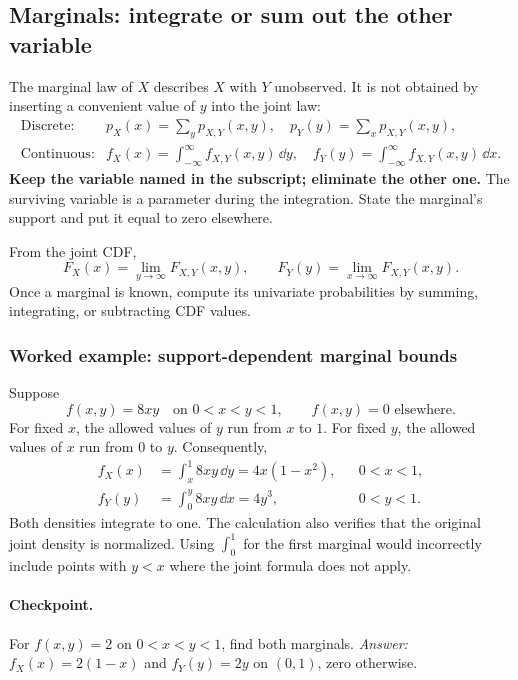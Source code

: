 \subsection{Marginals: integrate or sum out the other variable}

The marginal law of $X$ describes $X$ with $Y$ unobserved. It is not obtained by inserting a convenient value of $y$ into the joint law:
\[
\begin{array}{ll}
\text{Discrete:}&p_X(x)=\displaystyle\sum_y p_{X,Y}(x,y),\quad
p_Y(y)=\displaystyle\sum_x p_{X,Y}(x,y),\\[5pt]
\text{Continuous:}&f_X(x)=\displaystyle\int_{-\infty}^{\infty}f_{X,Y}(x,y)\,\dd y,\quad
f_Y(y)=\displaystyle\int_{-\infty}^{\infty}f_{X,Y}(x,y)\,\dd x.
\end{array}
\]
\textbf{Keep the variable named in the subscript; eliminate the other one.} The surviving variable is a parameter during the integration. State the marginal's support and put it equal to zero elsewhere.

From the joint CDF,
\[
 F_X(x)=\lim_{y\to\infty}F_{X,Y}(x,y),\qquad
 F_Y(y)=\lim_{x\to\infty}F_{X,Y}(x,y).
\]
Once a marginal is known, compute its univariate probabilities by summing, integrating, or subtracting CDF values.

\subsubsection*{Worked example: support-dependent marginal bounds}
Suppose
\[
 f(x,y)=8xy\quad\text{on }0<x<y<1,
 \qquad f(x,y)=0\text{ elsewhere}.
\]
For fixed $x$, the allowed values of $y$ run from $x$ to $1$. For fixed $y$, the allowed values of $x$ run from $0$ to $y$. Consequently,
\[
\begin{aligned}
 f_X(x)&=\int_x^1 8xy\,\dd y=4x(1-x^2),&&0<x<1,\\
 f_Y(y)&=\int_0^y 8xy\,\dd x=4y^3,&&0<y<1.
\end{aligned}
\]
Both densities integrate to one. The calculation also verifies that the original joint density is normalized. Using $\int_0^1$ for the first marginal would incorrectly include points with $y<x$ where the joint formula does not apply.

\paragraph{Checkpoint.} For $f(x,y)=2$ on $0<x<y<1$, find both marginals. \emph{Answer:} $f_X(x)=2(1-x)$ and $f_Y(y)=2y$ on $(0,1)$, zero otherwise.


